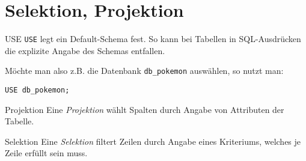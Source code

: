 \section{Selektion, Projektion}

\begin{sql}{USE}
    \texttt{USE} legt ein Default-Schema fest.
    So kann bei Tabellen in SQL-Ausdrücken die explizite Angabe des Schemas entfallen.

    Möchte man also z.B. die Datenbank \texttt{db\_pokemon} auswählen, so nutzt man:

    \begin{verbatim}
USE db_pokemon;
    \end{verbatim}
\end{sql}

\begin{defi}{Projektion}
    Eine \emph{Projektion} wählt Spalten durch Angabe von Attributen der Tabelle.
\end{defi}

\begin{defi}{Selektion}
    Eine \emph{Selektion} filtert Zeilen durch Angabe eines Kriteriums, welches je Zeile erfüllt sein muss.
\end{defi}

